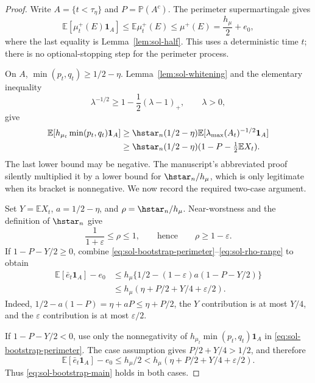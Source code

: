 \documentclass[../main.tex]{subfiles}
\begin{document}
\begin{proof}
Write $A=\{t<\tau_\eta\}$ and $P=\mathbb P(A^c)$.  The perimeter supermartingale gives
\begin{equation}
  \mathbb E[\mu_t^+(E)\mathbf 1_A]
  \leq\mathbb E\mu_t^+(E)
  \leq\mu^+(E)=\frac{h_\mu}{2}+e_0,
  \label{eq:sol-bootstrap-perimeter}
\end{equation}
where the last equality is Lemma~\ref{lem:sol-half}.  This uses a deterministic time $t$;
there is no optional-stopping step for the perimeter process.

On $A$, $\min(p_t,q_t)\geq1/2-\eta$.  Lemma~\ref{lem:sol-whitening} and the elementary
inequality
\begin{equation}
  \lambda^{-1/2}\geq1-\frac12(\lambda-1)_+,
  \qquad \lambda>0,
  \label{eq:sol-sqrt-tangent}
\end{equation}
give
\begin{equation}
\begin{split}
  \mathbb E[h_{\mu_t}\min(p_t,q_t)\mathbf 1_A]
  &\geq\hstar_n(1/2-\eta)
     \mathbb E[\lambda_{\max}(A_t)^{-1/2}\mathbf 1_A]\\
  &\geq\hstar_n(1/2-\eta)(1-P-\tfrac12\mathbb E X_t).
\end{split}
\label{eq:sol-bootstrap-profile-raw}
\end{equation}
The last lower bound may be negative.  The manuscript's abbreviated proof silently multiplied
it by a lower bound for $\hstar_n/h_\mu$, which is only legitimate when its bracket is
nonnegative.  We now record the required two-case argument.

Set $Y=\mathbb E X_t$, $a=1/2-\eta$, and
$\rho=\hstar_n/h_\mu$.  Near-worstness and the definition of $\hstar_n$ give
\begin{equation}
  \frac1{1+\varepsilon}\leq\rho\leq1,
  \qquad\text{hence}\qquad \rho\geq1-\varepsilon.
  \label{eq:sol-rho-range}
\end{equation}
If $1-P-Y/2\geq0$, combine
\eqref{eq:sol-bootstrap-perimeter}--\eqref{eq:sol-rho-range} to obtain
\[
\begin{split}
 \mathbb E[\bar e_t\mathbf 1_A]-e_0
 &\leq h_\mu\{1/2-(1-\varepsilon)a(1-P-Y/2)\}\\
 &\leq h_\mu(\eta+P/2+Y/4+\varepsilon/2).
\end{split}
\]
Indeed, $1/2-a(1-P)=\eta+aP\leq\eta+P/2$, the $Y$ contribution is at most $Y/4$, and the
$\varepsilon$ contribution is at most $\varepsilon/2$.

If $1-P-Y/2<0$, use only the nonnegativity of
$h_{\mu_t}\min(p_t,q_t)\mathbf 1_A$ in
\eqref{eq:sol-bootstrap-perimeter}.  The case assumption gives
$P/2+Y/4>1/2$, and therefore
\[
  \mathbb E[\bar e_t\mathbf 1_A]-e_0
  \leq h_\mu/2
  <h_\mu(\eta+P/2+Y/4+\varepsilon/2).
\]
Thus \eqref{eq:sol-bootstrap-main} holds in both cases.


\end{proof}
\end{document}
